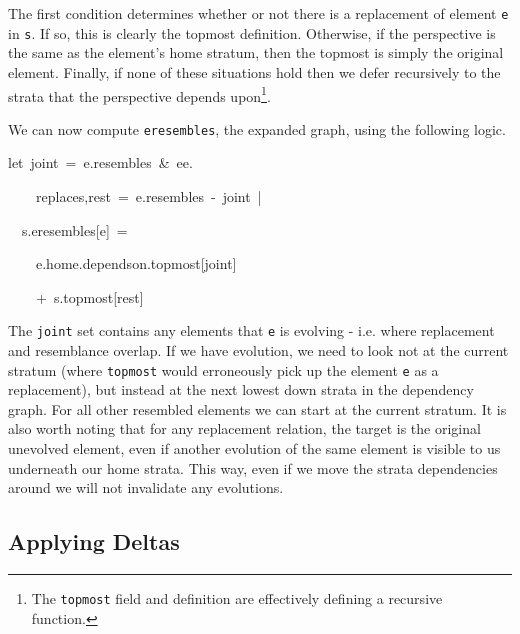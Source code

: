 The first condition determines whether or not there is a replacement
of element \texttt{e} in \texttt{s}. If so, this is clearly the topmost
definition. Otherwise, if the perspective is the same as the element\textquoteright s
home stratum, then the topmost is simply the original element. Finally,
if none of these situations hold then we defer recursively to the
strata that the perspective depends upon\footnote{The \texttt{topmost} field and definition are effectively defining
a recursive function.}.

We can now compute \texttt{eresembles}, the expanded graph, using
the following logic.
\begin{lyxcode}
{\footnotesize{}let~joint~=~e.resembles~\&~ee.}{\footnotesize \par}

{\footnotesize{}~~~~replaces,rest~=~e.resembles~-~joint~|}{\footnotesize \par}

{\footnotesize{}~~s.eresembles{[}e{]}~=}{\footnotesize \par}

{\footnotesize{}~~~~e.home.dependson.topmost{[}joint{]}}{\footnotesize \par}

{\footnotesize{}~~~~+~s.topmost{[}rest{]}}{\footnotesize \par}
\end{lyxcode}
The \texttt{joint} set contains any elements that \texttt{e} is evolving
- i.e. where replacement and resemblance overlap. If we have evolution,
we need to look not at the current stratum (where \texttt{topmost}
would erroneously pick up the element \texttt{e} as a replacement),
but instead at the next lowest down strata in the dependency graph.
For all other resembled elements we can start at the current stratum.
It is also worth noting that for any replacement relation, the target
is the original unevolved element, even if another evolution of the
same element is visible to us underneath our home strata. This way,
even if we move the strata dependencies around we will not invalidate
any evolutions.


\subsection{Applying Deltas}


